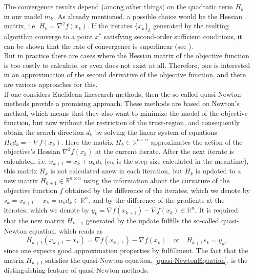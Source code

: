 The convergence results depend (among other things) on the quadratic term $H_k$ in our model $m_k$. As already mentioned, a possible choice would be the Hessian matrix, i.e. $H_k = \nabla^2 f(x_k)$. If the iterates $\{ x_k \}_k$ generated by the rsulting algorithm converge to a point $x^*$ satisfying second-order sufficient conditions, it can be shown that the rate of convergence is superlinear (see \cite[4.4~Local~convergence~of~trust-region~Newton~methods]{NocedalWright:2006}). \\
But in practice there are cases where the Hessian matrix of the objective function is too costly to calculate, or even does not exist at all. Therefore, one is interested in an approximation of the second derivative of the objective function, and there are various approaches for this. \\
If one considers Euclidean linesearch methods, then the so-called quasi-Newton methods provide a promising approach. These methods are based on Newton's method, which means that they also want to minimize the model of the objective function, but now without the restriction of the trust-region, and consequently obtain the search direction $d_k$ by solving the linear system of equations $H_k d_k = - \nabla f(x_k)$. Here the matrix $H_k \in \mathbb{R}^{n \times n}$ approximates the action of the objective's Hessian $\nabla^{2} f(x_k)$ at the current iterate. After the next iterate is calculated, i.e. $x_{k+1} = x_k + \alpha_k d_k$ ($\alpha_k$ is the step size calculated in the meantime), this matrix $H_k$ is not calculated anew in each iteration, but $H_k$ is updated to a new matrix $H_{k+1} \in \mathbb{R}^{n \times n}$ using the information about the curvature of the objective function $f$ obtained by the difference of the iterates, which we denote by $s_k = x_{k+1} - x_k = \alpha_k d_k \in \mathbb{R}^n$, and by the difference of the gradients at the iterates, which we denote by $y_k = \nabla f(x_{k+1}) - \nabla f(x_k) \in \mathbb{R}^n$. It is required that the new matrix $H_{k+1}$ generated by the update fulfills the so-called quasi-Newton equation, which reads as 
\begin{equation}\label{quasi-NewtonEquation}
    H_{k+1} (x_{k+1} - x_k) = \nabla f(x_{k+1}) - \nabla f(x_k) \quad \text{or} \quad H_{k+1} s_k = y_k,
\end{equation}
since one expects good approximation properties by fulfillment. The fact that the matrix $H_{k+1}$ satisfies the quasi-Newton equation, \cref{quasi-NewtonEquation}, is the distinguishing feature of quasi-Newton methods. \\

